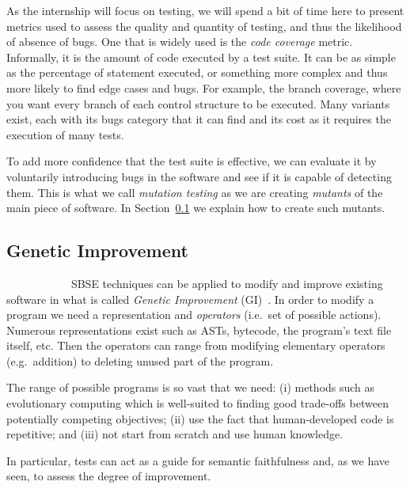 \documentclass[11pt]{sdm}
\newcommand{\todo}[1]{\colorbox{Red!75}{\textcolor{white}{\textbf{TODO\ifx&#1&\else: #1\fi}}}}
\begin{document}
As the internship will focus on testing, we will spend a bit of time here to present metrics used to assess the quality and quantity of testing, and thus the likelihood of absence of bugs.
One that is widely used is the \textit{code coverage} metric.
Informally, it is the amount of code executed by a test suite.
It can be as simple as the percentage of statement executed, or something more complex and thus more likely to find edge cases and bugs.
For example, the branch coverage, where you want every branch of each control structure to be executed.
Many variants exist, each with its bugs category that it can find and its cost as it requires the execution of many tests.

To add more confidence that the test suite is effective, we can evaluate it by voluntarily introducing bugs in the software and see if it is capable of detecting them.
This is what we call \textit{mutation testing} as we are creating \textit{mutants} of the main piece of software.
In Section~\ref{applications} we explain how to create such mutants.

\subsection{Genetic Improvement}
\label{applications}
\todo{}
SBSE techniques can be applied to modify and improve existing software in what is called \textit{Genetic Improvement} (GI)~\cite{petke2017genetic}.
In order to modify a program we need a representation and \textit{operators} (i.e.\ set of possible actions).
Numerous representations exist such as ASTs, bytecode, the program's text file itself, etc.
Then the operators can range from modifying elementary operators (e.g.\ addition) to deleting unused part of the program.

The range of possible programs is so vast that we need: (i) methods such as evolutionary computing which is well-suited to finding good trade-offs between potentially competing objectives; (ii) use the fact that human-developed code is repetitive; and (iii) not start from scratch and use human knowledge.

In particular, tests can act as a guide for semantic faithfulness and, as we have seen, to assess the degree of improvement.



\end{document}
